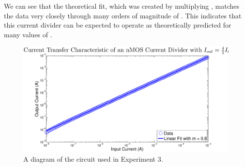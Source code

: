 We can see that the theoretical fit, which was created by multiplying , matches the data very closely through many orders of magnitude of \Iin. This indicates that this current divider can be expected to operate as theoretically predicted for many values of \Iin.

\begin{figure}[H]
\centering
\includegraphics[width=\linewidth]{../Figures/Experiment3Figure1.eps}
\caption{A diagram of the circuit used in Experiment 3.}
\label{fig:exp3p1}
\end{figure}

